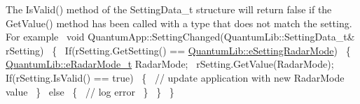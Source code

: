 The Is\+Valid() method of the Setting\+Data\+\_\+t structure will return false if the Get\+Value() method has been called with a type that does not match the setting.~\newline
For example~\newline
void Quantum\+App\+::\+Setting\+Changed(\+Quantum\+Lib\+::\+Setting\+Data\+\_\+t\& r\+Setting)~\newline
\{~\newline
If(r\+Setting.\+Get\+Setting() == \mbox{\hyperlink{namespace_quantum_lib_acc8124e3e65bca4aa798d03a55e3d54ca979ebf5f13199739e12a44ae3a7d7596}{Quantum\+Lib\+::e\+Setting\+Radar\+Mode}})~\newline
\{~\newline
 \mbox{\hyperlink{namespace_quantum_lib_ade0390db62ad71cd1a56b97245d00619}{Quantum\+Lib\+::e\+Radar\+Mode\+\_\+t}} Radar\+Mode;~\newline
 r\+Setting.\+Get\+Value(\+Radar\+Mode);~\newline
 If(r\+Setting.\+Is\+Valid() == true)~\newline
 \{~\newline
 // update application with new Radar\+Mode value~\newline
 \}~\newline
 else~\newline
 \{~\newline
 // log error~\newline
 \}~\newline
 \}~\newline
\}~\newline
